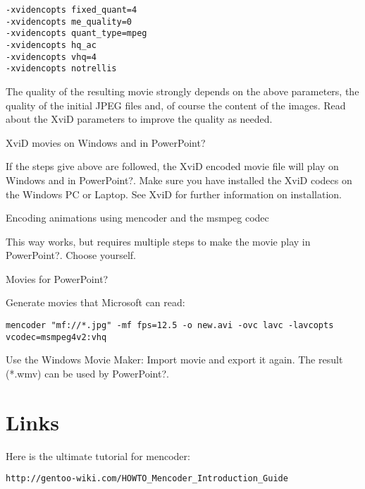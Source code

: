 \begin{verbatim}
-xvidencopts fixed_quant=4
-xvidencopts me_quality=0
-xvidencopts quant_type=mpeg
-xvidencopts hq_ac
-xvidencopts vhq=4
-xvidencopts notrellis
\end{verbatim}

 The quality of the resulting movie strongly depends on the above
parameters, the quality of the initial JPEG files and, of course the
content of the images. Read about the XviD parameters to improve the
quality as needed.

XviD movies on Windows and in PowerPoint?

 If the steps give above are followed, the XviD encoded movie file
will play on Windows and in PowerPoint?. Make sure you have installed
the XviD codecs on the Windows PC or Laptop. See XviD for further
information on installation.

Encoding animations using mencoder and the msmpeg codec

 This way works, but requires multiple steps to make the movie play in
PowerPoint?. Choose yourself.

 Movies for PowerPoint?

Generate movies that Microsoft can read: 
\begin{verbatim}
mencoder "mf://*.jpg" -mf fps=12.5 -o new.avi -ovc lavc -lavcopts vcodec=msmpeg4v2:vhq
\end{verbatim}

Use the Windows Movie Maker: Import movie and export it again. The result (*.wmv) can be used by PowerPoint?.

\section{Links}
Here is the ultimate tutorial for mencoder: 
\begin{verbatim}
http://gentoo-wiki.com/HOWTO_Mencoder_Introduction_Guide
\end{verbatim}
 

